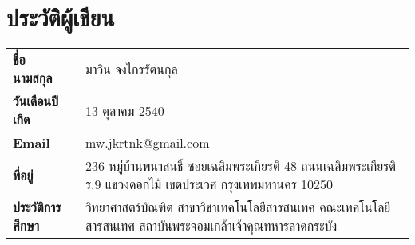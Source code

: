 \chapter{ประวัติผู้เขียน}
\begin{tabularx}{\linewidth}{lX}
	\textbf{ชื่อ – นามสกุล} & มาวิน จงไกรรัตนกุล \\
	\textbf{วันเดือนปีเกิด} & 13 ตุลาคม 2540 \\
	\textbf{Email} & mw.jkrtnk@gmail.com \\
	\textbf{ที่อยู่} & 236 หมู่บ้านพนาสนธิ์ ซอยเฉลิมพระเกียรติ 48 ถนนเฉลิมพระเกียรติ ร.9 แขวงดอกไม้ เขตประเวศ กรุงเทพมหานคร 10250 \\
	\textbf{ประวัติการศึกษา} & วิทยาศาสตร์​บัณฑิต สาขาวิชาเทคโนโลยีสารสนเทศ คณะเทคโนโลยีสารสนเทศ สถาบันพระจอมเกล้าเจ้าคุณทหารลาดกระบัง \\
\end{tabularx}